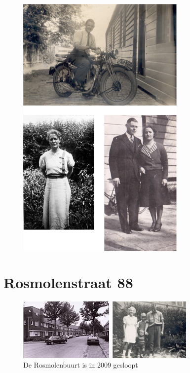 \documentclass[12pt,twoside]{memoir}
\begin{document}
\begin{figure}
\includegraphics[width=\textwidth]{img/ch4/ouders2}
\caption*{\footnotesize }
\end{figure}


\chapter{Rosmolenstraat 88} %
\label{cha:rosmolenstraat}

\begin{figure}
\includegraphics[width=\textwidth]{img/ch5/rosmolen2}
\caption*{\footnotesize De Rosmolenbuurt is in 2009 gesloopt}
\end{figure}
\end{document}
